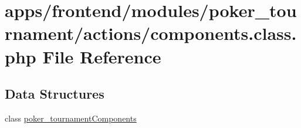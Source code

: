 \hypertarget{frontend_2modules_2poker__tournament_2actions_2components_8class_8php}{\section{apps/frontend/modules/poker\-\_\-tournament/actions/components.class.\-php File Reference}
\label{frontend_2modules_2poker__tournament_2actions_2components_8class_8php}
}
\subsection*{Data Structures}
\begin{DoxyCompactItemize}
\item 
class \hyperlink{classpoker__tournament_components}{poker\-\_\-tournament\-Components}
\end{DoxyCompactItemize}
